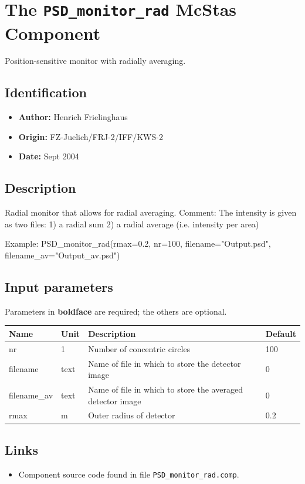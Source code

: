 \section{The \texttt{PSD\_monitor\_rad} McStas Component}
Position-sensitive monitor with radially averaging.

\subsection*{Identification}
\begin{itemize}
  \item \textbf{Author:} Henrich Frielinghaus
  \item \textbf{Origin:} FZ-Juelich/FRJ-2/IFF/KWS-2
  \item \textbf{Date:} Sept 2004
\end{itemize}

\subsection*{Description}
Radial monitor that allows for radial averaging. Comment: The intensity is given as two files: 1) a radial sum 2) a radial average (i.e. intensity per area)

Example: PSD\_monitor\_rad(rmax=0.2, nr=100, filename="Output.psd", filename\_av="Output\_av.psd")

\subsection*{Input parameters}
Parameters in \textbf{boldface} are required; the others are optional.

\begin{longtable}{p{}p{}p{}p{}}
\toprule
\textbf{Name} & \textbf{Unit} & \textbf{Description} & \textbf{Default} \\
\midrule
\endhead
nr & 1 & Number of concentric circles & 100 \\
filename & text & Name of file in which to store the detector image & 0 \\
filename\_av & text & Name of file in which to store the averaged detector image & 0 \\
rmax & m & Outer radius of detector & 0.2 \\
\bottomrule
\end{longtable}

\subsection*{Links}
\begin{itemize}
  \item Component source code found in file \texttt{PSD\_monitor\_rad.comp}.
\end{itemize}

